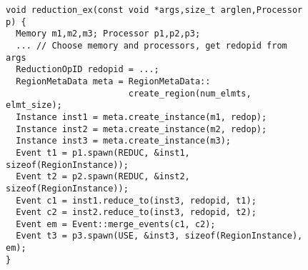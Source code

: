 \begin{figure}
\begin{lrbox}{\mylistingbox}
\begin{lstlisting}
void reduction_ex(const void *args,size_t arglen,Processor p) {
  Memory m1,m2,m3; Processor p1,p2,p3;
  ... // Choose memory and processors, get redopid from args
  ReductionOpID redopid = ...;
  RegionMetaData meta = RegionMetaData::
                        create_region(num_elmts, elmt_size);
  Instance inst1 = meta.create_instance(m1, redop);
  Instance inst2 = meta.create_instance(m2, redop);
  Instance inst3 = meta.create_instance(m3);
  Event t1 = p1.spawn(REDUC, &inst1, sizeof(RegionInstance));
  Event t2 = p2.spawn(REDUC, &inst2, sizeof(RegionInstance));
  Event c1 = inst1.reduce_to(inst3, redopid, t1);
  Event c2 = inst2.reduce_to(inst3, redopid, t2);
  Event em = Event::merge_events(c1, c2);
  Event t3 = p3.spawn(USE, &inst3, sizeof(RegionInstance), em);
}
\end{lstlisting}
\end{lrbox}
\subfigure{\usebox{\mylistingbox}} \\

\end{figure}
